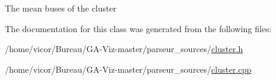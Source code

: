The mean buses of the cluster 

The documentation for this class was generated from the following files\+:\begin{DoxyCompactItemize}
\item 
/home/vicor/\+Bureau/\+G\+A-\/\+Viz-\/master/parseur\+\_\+sources/\hyperlink{cluster_8h}{cluster.\+h}\item 
/home/vicor/\+Bureau/\+G\+A-\/\+Viz-\/master/parseur\+\_\+sources/\hyperlink{cluster_8cpp}{cluster.\+cpp}\end{DoxyCompactItemize}
